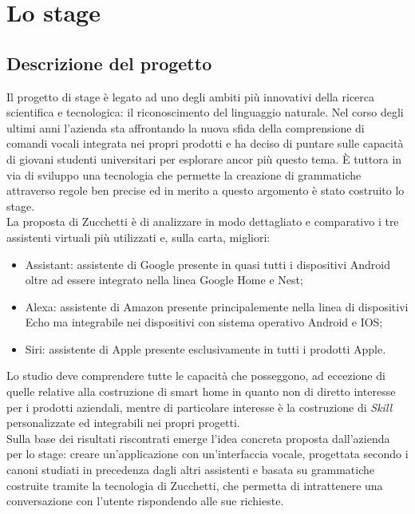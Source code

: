 
\chapter{Lo stage}
\label{cap:lo-stage}


\section{Descrizione del progetto}
Il progetto di stage è legato ad uno degli ambiti più innovativi della ricerca scientifica e tecnologica: il riconoscimento del linguaggio naturale.
Nel corso degli ultimi anni l'azienda sta affrontando la nuova sfida della comprensione di comandi vocali integrata nei propri prodotti e ha deciso di puntare sulle capacità di giovani studenti universitari per esplorare ancor più questo tema. È tuttora in via di sviluppo una tecnologia che permette la creazione di grammatiche attraverso regole ben precise ed in merito a questo argomento è stato costruito lo stage.\\
La proposta di Zucchetti è di analizzare in modo dettagliato e comparativo i tre assistenti virtuali più utilizzati e, sulla carta, migliori:
\begin{itemize}
	\item Assistant: assistente di Google presente in quasi tutti i dispositivi Android oltre ad essere integrato nella linea Google Home e Nest;
	\item Alexa: assistente di Amazon presente principalemente nella linea di dispositivi Echo ma integrabile nei dispositivi con sistema operativo Android e IOS;
	\item Siri: assistente di Apple presente esclusivamente in tutti i prodotti Apple.
\end{itemize}
Lo studio deve comprendere tutte le capacità che posseggono, ad eccezione di quelle relative alla costruzione di smart home in quanto non di diretto interesse per i prodotti aziendali, mentre di particolare interesse è la costruzione di \textit{Skill} personalizzate ed integrabili nei propri progetti. \\
Sulla base dei risultati riscontrati emerge l'idea concreta proposta dall'azienda per lo stage: creare un'applicazione con un'interfaccia vocale, progettata secondo i canoni studiati in precedenza dagli altri assistenti e basata su grammatiche costruite tramite la tecnologia di Zucchetti, che permetta di intrattenere una conversazione con l'utente rispondendo alle sue richieste.

